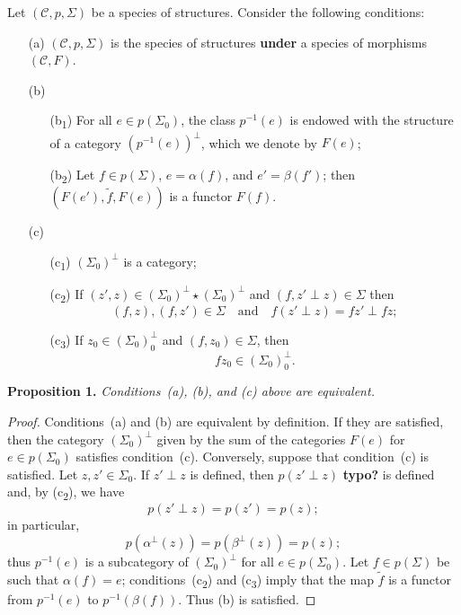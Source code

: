 \documentclass[a4paper,oneside,nobib,nofonts,notitlepage,notoc,nols,fleqn,justified]{tufte-book}
\newenvironment{itenv}[1]
  {\phantomsection\par\medskip\noindent\textbf{#1.}\itshape}
  {\par\medskip}
\newcommand{\oldpage}[1]{{\reversemarginpar\marginnote{\raggedleft\footnotesize\textit{p.~#1}}}}
\newcommand{\unsure}[1]{{\color{purple}\textbf{#1}}}
\newcommand{\CC}{\mathcal{C}}
\begin{document}
Let $(\CC,p,\Sigma)$ be a species of structures.
Consider the following conditions:
\begin{enumerate}
  \item[(a)]
    $(\CC,p,\Sigma)$ is the species of structures \unsure{under} a species of morphisms $(\CC,F)$.
  \oldpage{355}
  \item[(b)]
    \begin{enumerate}
      \item[(b\textsubscript{1})]
        For all $e\in p(\Sigma_0)$, the class $p^{-1}(e)$ is endowed with the structure of a category $(p^{-1}(e))^\perp$, which we denote by $F(e)$;
      \item[(b\textsubscript{2})]
        Let $f\in p(\Sigma)$, $e=\alpha(f)$, and $e'=\beta(f')$;
        then $(F(e'),\widetilde{f},F(e))$ is a functor $F(f)$.
    \end{enumerate}
  \item[(c)]
    \begin{enumerate}
      \item[(c\textsubscript{1})]
        $(\Sigma_0)^\perp$ is a category;
      \item[(c\textsubscript{2})]
        If $(z',z)\in(\Sigma_0)^\perp\star(\Sigma_0)^\perp$ and $(f,z'\perp z)\in\Sigma$ then
        \[
          (f,z),(f,z')\in\Sigma
          \quad\text{and}\quad
          f(z'\perp z)=fz'\perp fz;
        \]
      \item[(c\textsubscript{3})]
        If $z_0\in(\Sigma_0)_0^\perp$ and $(f,z_0)\in\Sigma$, then
        \[
          fz_0\in(\Sigma_0)_0^\perp.
        \]
    \end{enumerate}
\end{enumerate}

\begin{itenv}{Proposition 1}
\label{proposition:1}
  Conditions~(a), (b), and (c) above are equivalent.
\end{itenv}

\begin{proof}
  Conditions~(a) and (b) are equivalent by definition.
  If they are satisfied, then the category $(\Sigma_0)^\perp$ given by the sum of the categories $F(e)$ for $e\in p(\Sigma_0)$ satisfies condition~(c).
  Conversely, suppose that condition~(c) is satisfied.
  Let $z,z'\in\Sigma_0$.
  If $z'\perp z$ is defined, then $p(z'\perp z)$ \unsure{typo?} is defined and, by (c\textsubscript{2}), we have
  \[
    p(z'\perp z)
    = p(z')
    = p(z);
  \]
  in particular,
  \[
    p(\alpha^\perp(z))
    = p(\beta^\perp(z))
    = p(z);
  \]
  thus $p^{-1}(e)$ is a subcategory of $(\Sigma_0)^\perp$ for all $e\in p(\Sigma_0)$.
  Let $f\in p(\Sigma)$ be such that $\alpha(f)=e$;
  conditions~(c\textsubscript{2}) and (c\textsubscript{3}) imply that the map $\widetilde{f}$ is a functor from $p^{-1}(e)$ to $p^{-1}(\beta(f))$.
  Thus (b) is satisfied.
\end{proof}
\end{document}
